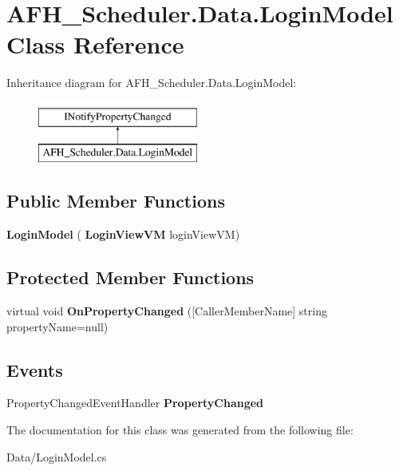 \section{A\+F\+H\+\_\+\+Scheduler.\+Data.\+Login\+Model Class Reference}
\label{class_a_f_h___scheduler_1_1_data_1_1_login_model}
Inheritance diagram for A\+F\+H\+\_\+\+Scheduler.\+Data.\+Login\+Model\+:\begin{figure}[H]
\begin{center}
\leavevmode
\includegraphics[height=2.000000cm]{class_a_f_h___scheduler_1_1_data_1_1_login_model}
\end{center}
\end{figure}
\subsection*{Public Member Functions}
\begin{DoxyCompactItemize}
\item 
\mbox{\label{class_a_f_h___scheduler_1_1_data_1_1_login_model_a987984faea01d2b6dc3065b10fabeced}} 
{\bfseries Login\+Model} (\textbf{ Login\+View\+VM} login\+View\+VM)
\end{DoxyCompactItemize}
\subsection*{Protected Member Functions}
\begin{DoxyCompactItemize}
\item 
\mbox{\label{class_a_f_h___scheduler_1_1_data_1_1_login_model_ad5e922e3417546742e04f54ca94ce5e4}} 
virtual void {\bfseries On\+Property\+Changed} ([Caller\+Member\+Name] string property\+Name=null)
\end{DoxyCompactItemize}
\subsection*{Events}
\begin{DoxyCompactItemize}
\item 
\mbox{\label{class_a_f_h___scheduler_1_1_data_1_1_login_model_a76a8c101f6af2ddf06288a66349c9cd3}} 
Property\+Changed\+Event\+Handler {\bfseries Property\+Changed}
\end{DoxyCompactItemize}


The documentation for this class was generated from the following file\+:\begin{DoxyCompactItemize}
\item 
Data/Login\+Model.\+cs\end{DoxyCompactItemize}
